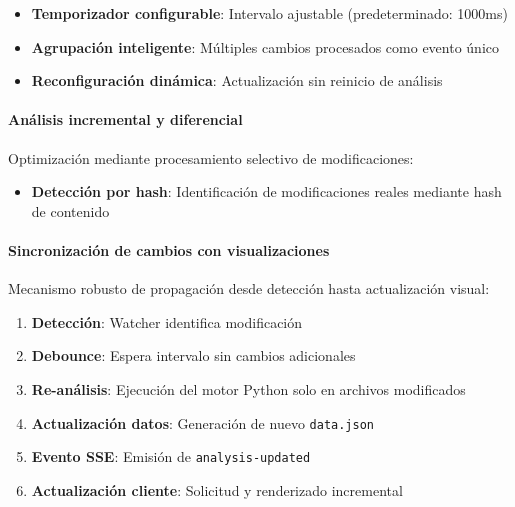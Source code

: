 \documentclass[a4paper, 12pt]{book}
\begin{document}
\begin{itemize}
  \item \textbf{Temporizador configurable}: Intervalo ajustable (predeterminado: 1000ms)
  \item \textbf{Agrupación inteligente}: Múltiples cambios procesados como evento único
  \item \textbf{Reconfiguración dinámica}: Actualización sin reinicio de análisis
\end{itemize}

\paragraph{Análisis incremental y diferencial}
Optimización mediante procesamiento selectivo de modificaciones:

\begin{itemize}
  \item \textbf{Detección por hash}: Identificación de modificaciones reales mediante hash de contenido
\end{itemize}

\paragraph{Sincronización de cambios con visualizaciones}
Mecanismo robusto de propagación desde detección hasta actualización visual:

\begin{enumerate}
  \item \textbf{Detección}: Watcher identifica modificación
  \item \textbf{Debounce}: Espera intervalo sin cambios adicionales
  \item \textbf{Re-análisis}: Ejecución del motor Python solo en archivos modificados
  \item \textbf{Actualización datos}: Generación de nuevo \texttt{data.json}
  \item \textbf{Evento SSE}: Emisión de \texttt{analysis-updated}
  \item \textbf{Actualización cliente}: Solicitud y renderizado incremental
\end{enumerate}
\end{document}
